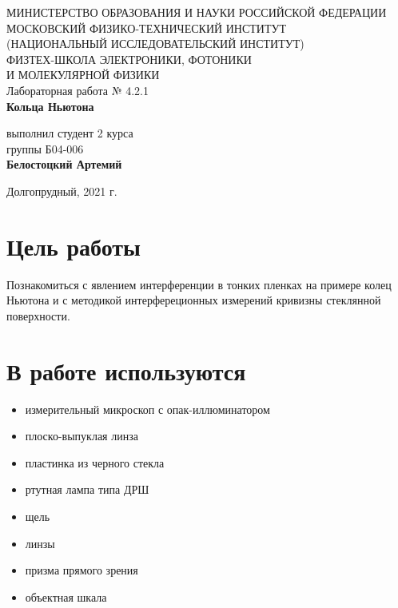 \documentclass[a4paper,12pt]{article}
\begin{document}
 

\begin{titlepage}
	\begin{center}
		\large 	МИНИСТЕРСТВО ОБРАЗОВАНИЯ И НАУКИ РОССИЙСКОЙ ФЕДЕРАЦИИ\\
				МОСКОВСКИЙ ФИЗИКО-ТЕХНИЧЕСКИЙ ИНСТИТУТ \\
				(НАЦИОНАЛЬНЫЙ ИССЛЕДОВАТЕЛЬСКИЙ ИНСТИТУТ)\\ 
				ФИЗТЕХ-ШКОЛА ЭЛЕКТРОНИКИ, ФОТОНИКИ \\
				И МОЛЕКУЛЯРНОЙ ФИЗИКИ \\
		
		
		\vspace{4.0 cm}
		Лабораторная работа № 4.2.1 \\ 
		\LARGE \textbf{Кольца Ньютона}
	\end{center}
	\vspace{3 cm} \large
	
	\begin{flushright}
		выполнил студент 2 курса \\
		{группы Б04-006}\\
		\textbf{Белостоцкий Артемий}\\
	\end{flushright}
	
	\vfill

	\begin{center}
	Долгопрудный, 2021 г.
	\end{center}
\end{titlepage}                                                                      

\section*{Цель работы}

Познакомиться с явлением интерференции в тонких пленках на примере колец Ньютона и с методикой интерфереционных измерений кривизны стеклянной поверхности.


\section*{В работе используются}
\begin{itemize}
\item измерительный микроскоп с опак-иллюминатором
\item плоско-выпуклая линза
\item пластинка из черного стекла 
\item ртутная лампа типа ДРШ
\item щель
\item линзы
\item призма прямого зрения
\item объектная шкала


\end{itemize}
\end{document}
